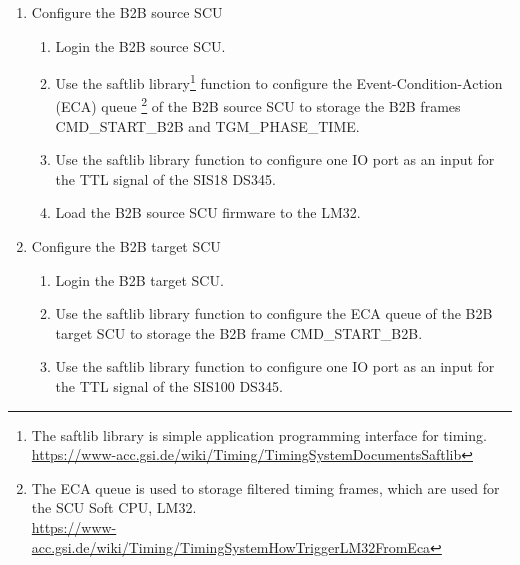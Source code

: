 \begin{enumerate}
  \item Configure the B2B source SCU
  \begin{enumerate}
    \item Login the B2B source SCU.
    \item Use the saftlib library\footnote{The saftlib library is simple application programming interface for timing.\\  \url{https://www-acc.gsi.de/wiki/Timing/TimingSystemDocumentsSaftlib}}  function to configure the Event-Condition-Action (ECA) queue \footnote{The ECA queue is used to storage filtered timing frames, which are used for the SCU Soft CPU, LM32. \\ \url{https://www-acc.gsi.de/wiki/Timing/TimingSystemHowTriggerLM32FromEca}} of the B2B source SCU to storage the B2B frames CMD\_START\_B2B and TGM\_PHASE\_TIME.
	\item Use the saftlib library function to configure one IO port as an input for the TTL signal of the SIS18 DS345.
	\item Load the B2B source SCU firmware to the LM32.
	 \end{enumerate}
  \item Configure the B2B target SCU
    \begin{enumerate}
    \item Login the B2B target SCU.
    \item Use the saftlib library function to configure the ECA queue of the B2B target SCU to storage the B2B frame CMD\_START\_B2B.
	\item Use the saftlib library function to configure one IO port as an input for the TTL signal of the SIS100 DS345.

\end{enumerate}
\end{enumerate}
